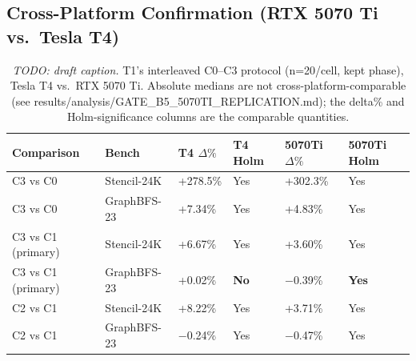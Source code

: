 \documentclass[journal]{IEEEtran}
\begin{document}
\subsection{Cross-Platform Confirmation (RTX 5070 Ti vs.\ Tesla T4)}
\label{sec:eval-cross-platform}

\begin{table}[t]
  \centering
  \caption{\emph{TODO: draft caption.} T1's interleaved C0--C3 protocol
    (n=20/cell, kept phase), Tesla T4 vs.\ RTX 5070 Ti. Absolute medians are
    not cross-platform-comparable (see
    results/analysis/GATE\_B5\_5070TI\_REPLICATION.md); the delta\% and
    Holm-significance columns are the comparable quantities.}
  \label{tab:cross-platform-t1}
  \begin{tabularx}{\columnwidth}{l l X X X X}
    \toprule
    Comparison & Bench & T4 $\Delta\%$ & T4 Holm & 5070Ti $\Delta\%$ & 5070Ti Holm \\
    \midrule
    C3 vs C0 & Stencil-24K & +278.5\% & Yes & +302.3\% & Yes \\
    C3 vs C0 & GraphBFS-23 & +7.34\% & Yes & +4.83\% & Yes \\
    C3 vs C1 (primary) & Stencil-24K & +6.67\% & Yes & +3.60\% & Yes \\
    C3 vs C1 (primary) & GraphBFS-23 & +0.02\% & \textbf{No} & $-$0.39\% & \textbf{Yes} \\
    C2 vs C1 & Stencil-24K & +8.22\% & Yes & +3.71\% & Yes \\
    C2 vs C1 & GraphBFS-23 & $-$0.24\% & Yes & $-$0.47\% & Yes \\
    \bottomrule
  \end{tabularx}
\end{table}

\end{document}
